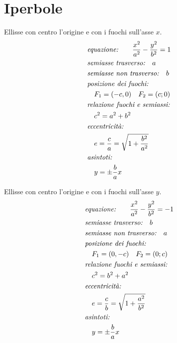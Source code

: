 \documentclass{article}
\begin{document}
  \newpage
  \section{Iperbole}

  \begin{minipage}[t]{.45\textwidth}
    Ellisse con centro l'origine e con i fuochi sull'asse $x$.
    \begin{align}
      & \text{\textit{equazione:}} \qquad
      \frac{x^2}{a^2} - \frac{y^2}{b^2} = 1 \\
      & \text{\textit{semiasse trasverso:}} \quad a \\
      & \text{\textit{semiasse non trasverso:}} \quad b \\
      & \text{\textit{posizione dei fuochi:}} \nonumber \\
      & \quad F_1 = (-c, 0) \quad F_2 = (c; 0) \\
      & \text{\textit{relazione fuochi e semiassi:}} \nonumber \\
      & \quad c^2 = a^2 + b^2 \\
      & \text{\textit{eccentricità:}} \nonumber \\
      & \quad e = \frac{c}{a} = \sqrt{1+\frac{b^2}{a^2}} \\
      & \text{\textit{asintoti:}} \nonumber \\
      & \quad y=\pm \frac{b}{a}x
    \end{align}
  \end{minipage}
  \hfill
  \begin{minipage}[t]{.45\textwidth}
    Ellisse con centro l'origine e con i fuochi sull'asse $y$.
    \begin{align}
      & \text{\textit{equazione:}} \qquad
      \frac{x^2}{a^2} - \frac{y^2}{b^2} = -1 \\
      & \text{\textit{semiasse trasverso:}} \quad b \\
      & \text{\textit{semiasse non trasverso:}} \quad a \\
      & \text{\textit{posizione dei fuochi:}} \nonumber \\
      & \quad F_1 = (0, -c) \quad F_2 = (0; c) \\
      & \text{\textit{relazione fuochi e semiassi:}} \nonumber \\
      & \quad c^2 = b^2 + a^2 \\
      & \text{\textit{eccentricità:}} \nonumber \\
      & \quad e = \frac{c}{b} = \sqrt{1+\frac{a^2}{b^2}} \\
      & \text{\textit{asintoti:}} \nonumber \\
      & \quad y=\pm \frac{b}{a}x
    \end{align}
  \end{minipage}
\end{document}
